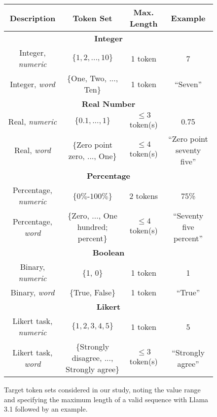 \renewcommand{\arraystretch}{1.3}
\begin{figure*}[ht]
\centering
\small
\begin{tabular}{|c|c|c|c|}
\hline
\multicolumn{1}{|c}{\textbf{Description}} & \multicolumn{1}{|c}{\textbf{Token Set}} & \multicolumn{1}{|c}{\textbf{Max. Length}} & \multicolumn{1}{|c|}{\textbf{Example}} \\
\hline
\hline
\multicolumn{4}{|c|}{\cellcolor{lightgray}\textbf{Integer}} \\
\hline
Integer, \emph{numeric} & $\{1,2,...,10\}$ & 1 token & 7 \\
\hline
Integer, \emph{word} & \{One, Two, ..., Ten\} & 1 token & ``Seven'' \\
\hline
\hline
\multicolumn{4}{|c|}{\cellcolor{lightgray}\textbf{Real Number}} \\
\hline
Real, \emph{numeric} & $\{0.1,...,1\}$ & $\leq3$ token(s) & 0.75 \\
\hline
Real, \emph{word} & \{Zero point zero, ..., One\} & $\leq4$ token(s) & ``Zero point seventy five'' \\
\hline
\hline
\multicolumn{4}{|c|}{\cellcolor{lightgray}\textbf{Percentage}} \\
\hline
Percentage, \emph{numeric} & $\{0\%$-$100\%\}$ & 2 tokens & 75\% \\
\hline
Percentage, \emph{word} & \{Zero, ..., One hundred; percent\} & $\leq4$ token(s) & ``Seventy five percent'' \\
\hline
\hline
\multicolumn{4}{|c|}{\cellcolor{lightgray}\textbf{Boolean}} \\
\hline
Binary, \emph{numeric} & \{1, 0\} & 1 token & 1 \\
\hline
Binary, \emph{word} & \{True, False\} & 1 token & ``True'' \\
\hline
\hline
\multicolumn{4}{|c|}{\cellcolor{lightgray}\textbf{Likert}} \\
\hline
Likert task, \emph{numeric} & $\{1,2,3,4,5\}$ & 1 token & 5 \\
\hline  
Likert task, \emph{word} & \{Strongly disagree, ..., Strongly agree\} & $\leq3$ token(s) & ``Strongly agree'' \\
\hline
\end{tabular}
\caption{Target token sets considered in our study, noting the value range and specifying the maximum length of a valid sequence with Llama 3.1 followed by an example.}
\label{tab:target-labels}
\end{figure*}
